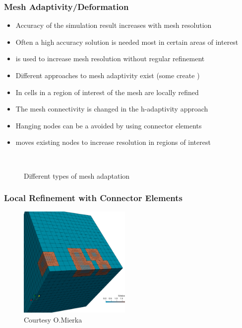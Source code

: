 \begin{frame}
\frametitle{Mesh Adaptivity/Deformation}
\begin{itemize}
\item Accuracy of the simulation result increases with mesh resolution
\item Often a high accuracy solution is needed most in certain areas of interest
\item {} is used to increase mesh resolution without regular refinement
\item Different approaches to mesh adaptivity exist (some create )
\item In  cells in a region of interest of the mesh are locally refined
\item The mesh connectivity is changed in the h-adaptivity approach
\item Hanging nodes can be a avoided by using connector elements
\item {} moves existing nodes to increase resolution in regions of interest
\end{itemize}
\end{frame}

\begin{frame}
\begin{figure}[h!]
\centering
{}\\
\caption{Different types of mesh adaptation}
\end{figure}
\end{frame}

\begin{frame}
\frametitle{Local Refinement with Connector Elements}
\begin{figure}[h!]
\centering
\includegraphics[width=0.48\textwidth]{screenshots/PROTOTYPE2.png}
\caption{Courtesy O.Mierka}
\label{fig:domains}
\end{figure}
\end{frame}

